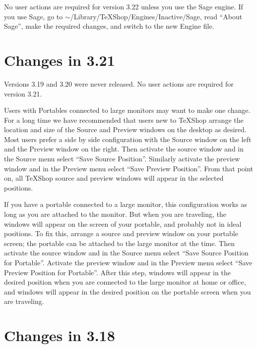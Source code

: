 \documentclass[11pt, oneside]{amsart}
\begin{document}
No user actions are required for version 3.22 unless you use the Sage engine. If you use Sage, go to $\sim$/Library/TeXShop/Engines/Inactive/Sage, read ``About Sage'', make the required changes, and switch to the new Engine file.

\section{Changes in 3.21}

Versions 3.19 and 3.20 were never released. No user actions are required for version 3.21.

Users with Portables connected to large monitors may want to make one change. For a  long time we have recommended that users new to
TeXShop  arrange the location and size of the Source and Preview windows on the desktop as desired. Most users prefer a side by side configuration with the Source window on the left and the Preview window on the right. Then activate the source
window and in the Source menu select ``Save Source Position''. Similarly activate the preview window and in the Preview menu select ``Save Preview Position''. From that point on, all
TeXShop source and preview windows will appear in the selected positions.

If you have a portable connected to a large monitor, this configuration works as long as you are attached to the monitor. But when you are traveling, the windows will appear on the screen of your portable, and probably not in ideal positions. To fix this, arrange a source and preview window on your portable screen; the portable can be attached to the large monitor at the time. Then activate the source window and in the Source menu select ``Save Source Position for Portable''. Activate the preview window and in the Preview menu select ``Save Preview Position for Portable''. After this step, windows will appear in the desired position when you are connected to the large monitor at home or office, and windows will appear in the desired position on the portable screen when you are traveling.


\section{Changes in 3.18}
\end{document}

